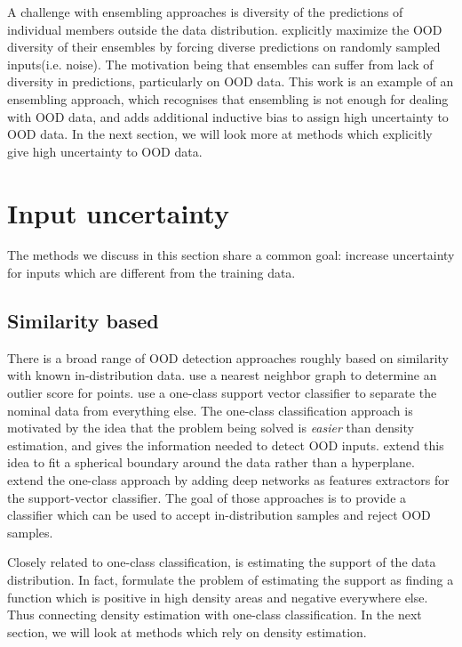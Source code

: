 \documentclass[../main.tex]{subfiles}
\begin{document}
A challenge with ensembling approaches is diversity of the predictions of individual members outside the data distribution. \citet{jain2019maximizing} explicitly maximize the OOD diversity of their ensembles by forcing diverse predictions on randomly sampled inputs(i.e. noise). The motivation being that ensembles can suffer from lack of diversity in predictions, particularly on OOD data. This work is an example of an ensembling approach, which recognises that ensembling is not enough for dealing with OOD data, and adds additional inductive bias to assign high uncertainty to OOD data. 
In the next section, we will look more at methods which explicitly give high uncertainty to OOD data. 


\section{Input uncertainty}
The methods we discuss in this section share a common goal: increase uncertainty for inputs which are different from the training data. 

\subsection{Similarity based}


There is a broad range of OOD detection approaches roughly based on similarity with known in-distribution data. \citep{hautamaki2004outlier, NIPS2009_3723, zhang2009new} use a nearest neighbor graph to determine an outlier score for points. 
\cite{scholkopf2000support} use a one-class support vector classifier to separate the nominal data from everything else. The one-class classification approach is motivated by the idea that the problem being solved is \emph{easier} than density estimation, and gives the information needed to detect OOD inputs.  
\citet{tax2004support} extend this idea to fit a spherical boundary around the data rather than a hyperplane. \cite{erfani2016high, ruff2018deep} extend the one-class approach by adding deep networks as features extractors for the support-vector classifier. The goal of those approaches is to provide a classifier which can be used to accept in-distribution samples and reject OOD samples. 

Closely related to one-class classification, is estimating the support of the data distribution. In fact, \citet{platt1999estimating} formulate the problem of estimating the support as finding a function which is positive in high density areas and negative everywhere else. Thus connecting density estimation with one-class classification. In the next section, we will look at methods which rely on density estimation. 
\end{document}
